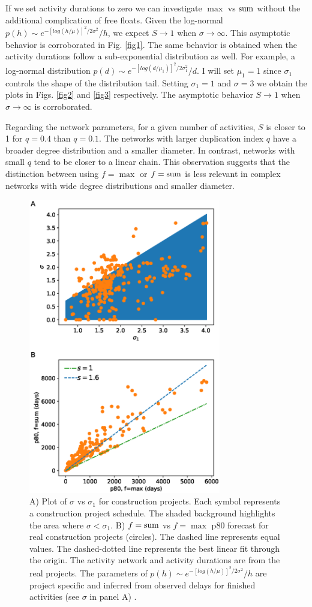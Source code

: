\documentclass[reprint,aps,prl,amsmath,amssymb,superscriptaddress,showpacs]{revtex4-1}
\begin{document}
If we set activity durations to zero we can investigate $\max$ vs ${\rm sum}$ without the additional complication of free floats. Given the log-normal $p(h)\sim e^{-[log(h/\mu)]^2/2\sigma^2}/h$, we expect $S\rightarrow1$ when $\sigma\rightarrow\infty$. This asymptotic behavior is corroborated in Fig. \ref{fig1}.
The same behavior is obtained when the activity durations follow a sub-exponential distribution as well. For example, a log-normal distribution $p(d)\sim e^{-[log(d/\mu_1)]^2/2\sigma_1^2}/d$. I will set $\mu_1=1$ since $\sigma_1$ controls the shape of the distribution tail. Setting $\sigma_1=1$ and $\sigma=3$ we obtain the plots in Figs. \ref{fig2} and \ref{fig3} respectively. The asymptotic behavior $S\rightarrow1$ when $\sigma\rightarrow\infty$ is corroborated.

Regarding the network parameters, for a given number of activities, $S$ is closer to 1 for $q=0.4$ than $q=0.1$. The networks with larger duplication index $q$ have a broader degree distribution and a smaller diameter. In contrast, networks with small $q$ tend to be closer to a linear chain. This observation suggests that the distinction between using $f={\max}$ or $f={\rm sum}$ is less relevant in complex networks with wide degree distributions and smaller diameter.  

\begin{figure}[t]
\includegraphics[width=3.3in]{fig.sigma_vs_sigma1.eps}
\caption{A) Plot of $\sigma$ vs $\sigma_1$ for construction projects. Each symbol represents a construction project schedule. The shaded background highlights the area where $\sigma<\sigma_1$. B) $f={\rm sum}$ vs $f=\max$ p80 forecast for real construction projects (circles). The dashed line represents equal values. The dashed-dotted line represents the best linear fit through the origin. The activity network and activity durations are from the real projects. The parameters of $p(h)\sim e^{-[log(h/\mu)]^2/2\sigma^2}/h$ are project specific and inferred from observed delays for finished activities (see $\sigma$ in panel A) .}
\label{fig4}
\end{figure}
\end{document}
